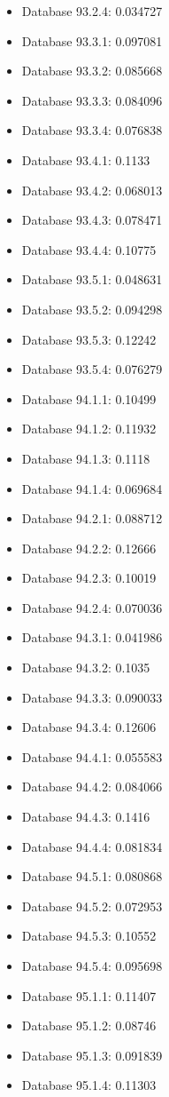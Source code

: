 \begin{itemize}
\item Database 93.2.4: 0.034727
\item Database 93.3.1: 0.097081
\item Database 93.3.2: 0.085668
\item Database 93.3.3: 0.084096
\item Database 93.3.4: 0.076838
\item Database 93.4.1: 0.1133
\item Database 93.4.2: 0.068013
\item Database 93.4.3: 0.078471
\item Database 93.4.4: 0.10775
\item Database 93.5.1: 0.048631
\item Database 93.5.2: 0.094298
\item Database 93.5.3: 0.12242
\item Database 93.5.4: 0.076279
\item Database 94.1.1: 0.10499
\item Database 94.1.2: 0.11932
\item Database 94.1.3: 0.1118
\item Database 94.1.4: 0.069684
\item Database 94.2.1: 0.088712
\item Database 94.2.2: 0.12666
\item Database 94.2.3: 0.10019
\item Database 94.2.4: 0.070036
\item Database 94.3.1: 0.041986
\item Database 94.3.2: 0.1035
\item Database 94.3.3: 0.090033
\item Database 94.3.4: 0.12606
\item Database 94.4.1: 0.055583
\item Database 94.4.2: 0.084066
\item Database 94.4.3: 0.1416
\item Database 94.4.4: 0.081834
\item Database 94.5.1: 0.080868
\item Database 94.5.2: 0.072953
\item Database 94.5.3: 0.10552
\item Database 94.5.4: 0.095698
\item Database 95.1.1: 0.11407
\item Database 95.1.2: 0.08746
\item Database 95.1.3: 0.091839
\item Database 95.1.4: 0.11303

\end{itemize}
